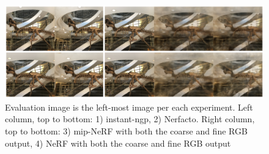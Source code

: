 \begin{figure}[h]
    \centering
    \includegraphics[width=1.0\textwidth]{figures/trex-result.png}
    \caption{Evaluation image is the left-most image per each experiment.
    Left column, top to bottom: 1) instant-ngp, 2) Nerfacto. Right column, top to bottom: 3) mip-NeRF with both the coarse and fine RGB output, 4) NeRF with both the coarse and fine RGB output}
    \label{fig:trex-result}
\end{figure}